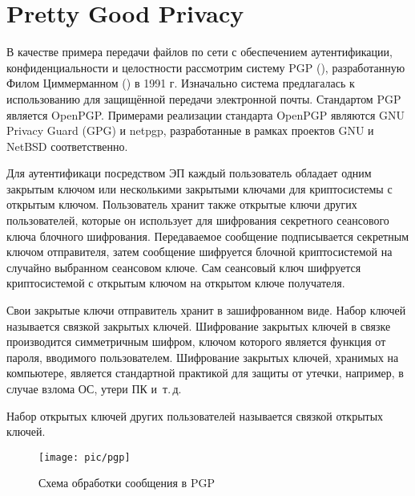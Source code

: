 \section{Pretty Good Privacy}

В качестве примера передачи файлов по сети с обеспечением аутентификации, конфиденциальности и целостности рассмотрим систему PGP (), разработанную Филом Циммерманном () в 1991 г. Изначально система предлагалась к использованию для защищённой передачи электронной почты. Стандартом PGP является OpenPGP. Примерами реализации стандарта OpenPGP являются GNU Privacy Guard (GPG) и netpgp, разработанные в рамках проектов GNU и NetBSD соответственно.

Для аутентификаци посредством ЭП каждый пользователь обладает одним закрытым ключом или несколькими закрытыми ключами для криптосистемы с открытым ключом. Пользователь хранит также открытые ключи других пользователей, которые он использует для шифрования секретного сеансового ключа блочного шифрования. Передаваемое сообщение подписывается секретным ключом отправителя, затем сообщение шифруется блочной криптосистемой на случайно выбранном сеансовом ключе. Сам сеансовый ключ шифруется криптосистемой с открытым ключом на открытом ключе получателя.

Свои закрытые ключи отправитель хранит в зашифрованном виде. Набор ключей называется связкой закрытых ключей. Шифрование закрытых ключей в связке производится симметричным шифром, ключом которого является функция от пароля, вводимого пользователем. Шифрование закрытых ключей, хранимых на компьютере, является стандартной практикой для защиты от утечки, например, в случае взлома ОС, утери ПК и~т.\,д.

Набор открытых ключей других пользователей называется связкой открытых ключей.

\begin{figure}[!ht]
	\centering
	\texttt{[image: pic/pgp]}
	\caption{Схема обработки сообщения в PGP\label{fig:pgp}}
\end{figure}

